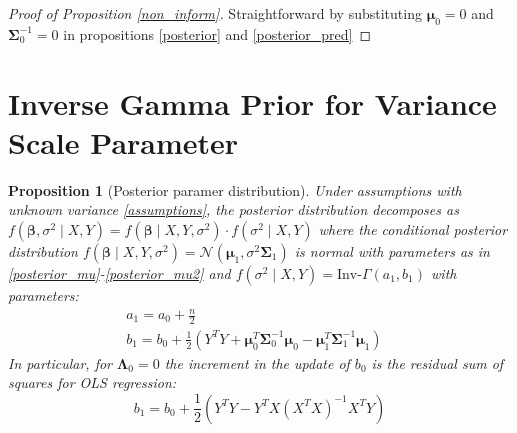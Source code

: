 \documentclass[10pt,fleqn]{amsart}
\newtheorem{proposition}[theorem]{Proposition}
\theoremstyle{definition}
\theoremstyle{remark}
\numberwithin{equation}{section}
\newcommand{\bbeta}{\boldsymbol{\beta}}
\newcommand{\mmu}{\boldsymbol{\mu}}
\newcommand{\SSigma}{\boldsymbol{\Sigma}}
\newcommand{\LLambda}{\boldsymbol{\Lambda}}
\newcommand{\XTXi}{\left(X^TX\right)^{-1}}
\newcommand{\invGamma}{\text{Inv-}\Gamma}
\begin{document}
\begin{proof}[Proof of Proposition \ref{non_inform}]
Straightforward by substituting $\mmu_0=0$ and $\SSigma_0^{-1}=0$ in propositions \ref{posterior} and \ref{posterior_pred}
\end{proof}

\section{Inverse Gamma Prior for Variance Scale Parameter}
\begin{proposition}[Posterior paramer distribution]\label{posterior_var}
    Under assumptions with unknown variance \ref{assumptions}, the posterior distribution decomposes as
    $f\left(\bbeta,\sigma^2\mid X, Y\right)=f\left(\bbeta\mid X, Y, \sigma^2\right)\cdot f\left(\sigma^2\mid X, Y\right)$ where the conditional posterior distribution $f(\bbeta\mid X, Y, \sigma^2)=\mathcal{N}(\mmu_1, \sigma^2\SSigma_1)$
    is normal with parameters as in \ref{posterior_mu}-\ref{posterior_mu2} and $f\left(\sigma^2\mid X, Y\right)=\invGamma\left(a_1, b_1\right)$
    with parameters:
    \begin{align}
        \label{posterior_sigsq}&a_1=a_0+\frac n 2&&\\
        \label{posterior_sigsq2}&b_1=b_0+\frac 12\left(Y^TY+\mmu_0^T\SSigma_0^{-1}\mmu_0-\mmu_1^T\SSigma_1^{-1}\mmu_1\right)&&
    \end{align}
    In particular, for $\LLambda_0=0$ the increment in the update of $b_0$ is the residual sum of squares for OLS regression:
    \begin{equation*}
        b_1=b_0+\frac 12 \left(Y^TY-Y^TX\XTXi X^TY\right)
    \end{equation*}
\end{proposition}
\end{document}
